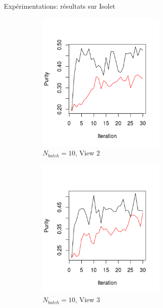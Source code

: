 \documentclass[hyperref={pdfpagelabels=false}]{beamer}
\begin{document}
\begin{frame}{Expérimentations: résultats sur Isolet}
\begin{figure}[!h]
\begin{subfigure}[b]{0.3\textwidth}
                    \includegraphics[width=0.7\textwidth, trim= 0cm 0.5cm 1cm 1.73cm, clip]{img/22.png}
                    \caption{$N_{batch}=10$, View 2}
                \end{subfigure}
                \begin{subfigure}[b]{0.3\textwidth}
                    \centering
                    \includegraphics[width=0.7\textwidth, trim= 0cm 0.5cm 1cm 2cm, clip]{img/33.png}
                    \caption{$N_{batch}=10$, View 3}
                \end{subfigure}\\
                \begin{subfigure}[b]{0.3\textwidth}

\end{subfigure}
\end{figure}
\end{frame}
\end{document}
